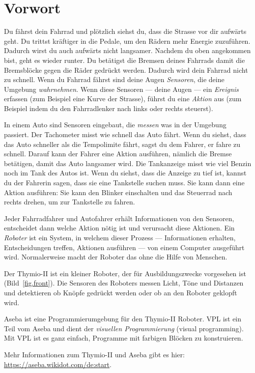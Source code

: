 \chapter*{Vorwort}


Du fährst dein Fahrrad und plötzlich siehst du, dass die Strasse vor dir
aufwärts geht.  Du trittst kräftiger in die Pedale, um den Rädern mehr Energie
zuzuführen. Dadurch wirst du auch aufwärts nicht langsamer. Nachdem du oben
angekommen bist, geht es wieder runter. Du betätigst die Bremsen deines
Fahrrads damit die Bremsblöcke gegen die Räder gedrückt werden. Dadurch wird
dein Fahrrad nicht zu schnell.  Wenn du Fahrrad fährst sind deine Augen
\emph{Sensoren}, die deine Umgebung \emph{wahrnehmen}. Wenn diese Sensoren ---
deine Augen --- ein \emph{Ereignis} erfassen (zum Beispiel eine Kurve der
Strasse), führst du eine \emph{Aktion} aus (zum Beispiel indem du den
Fahrradlenker nach links oder rechts steuerst).

In einem Auto sind Sensoren eingebaut, die \emph{messen} was in der Umgebung
passiert. Der Tachometer misst wie schnell das Auto fährt. Wenn du siehst, dass
das Auto schneller als die Tempolimite fährt, sagst du dem Fahrer, er fahre zu
schnell. Darauf kann der Fahrer eine Aktion ausführen, nämlich die Bremse
betätigen, damit das Auto langsamer wird. Die Tankanzeige misst wie viel Benzin
noch im Tank des Autos ist. Wenn du siehst, dass die Anzeige zu tief ist,
kannst du der Fahrerin sagen, dass sie eine Tankstelle suchen muss. Sie kann
dann eine Aktion ausführen: Sie kann den Blinker einschalten und das Steuerrad
nach rechts drehen, um zur Tankstelle zu fahren.

Jeder Fahrradfahrer und Autofahrer erhält Informationen von den Sensoren,
entscheidet dann welche Aktion nötig ist und verursacht diese Aktionen.
Ein \emph{Roboter} ist ein System, in welchem dieser Prozess --- Informationen
erhalten, Entscheidungen treffen, Aktionen ausführen --- von einem Computer
ausgeführt wird. Normalerweise macht der Roboter das ohne die Hilfe von
Menschen.


Der Thymio-II ist ein kleiner Roboter, der für Ausbildungszwecke vorgesehen ist
(Bild~\ref{fig.front}). Die Sensoren des Roboters messen Licht, Töne und
Distanzen und detektieren ob Knöpfe gedrückt werden oder ob an den Roboter
geklopft wird.

Aseba ist eine Programmierumgebung für den Thymio-II Roboter. VPL ist ein Teil
vom Aseba und dient der \emph{visuellen Programmierung} (visual programming).
Mit VPL ist es ganz einfach, Programme mit farbigen Blöcken zu konstruieren.

Mehr Informationen zum Thymio-II und Aseba gibt es hier: \url{https://aseba.wikidot.com/de:start}.


